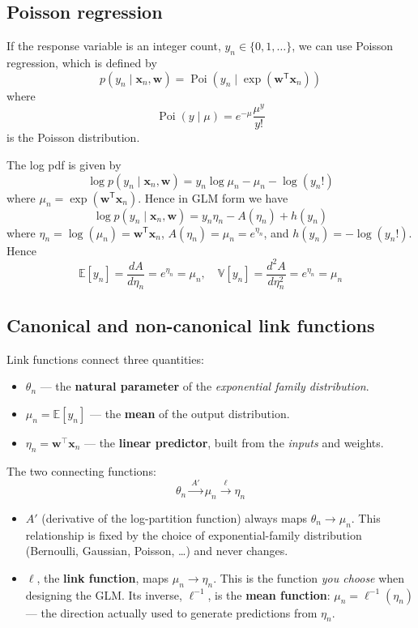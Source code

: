 \documentclass[11pt]{article}
\begin{document}
\subsection{Poisson regression}

If the response variable is an integer count, $y_n \in \{0,1,\ldots\}$, we can use Poisson regression, which is defined by
\[
p(y_n \mid \boldsymbol{x}_n, \boldsymbol{w})
= \operatorname{Poi}(y_n \mid \exp(\boldsymbol{w}^{\mathsf{T}}\boldsymbol{x}_n))
\]
where
\[
\operatorname{Poi}(y \mid \mu) = e^{-\mu}\frac{\mu^y}{y!}
\]
is the Poisson distribution.

The log pdf is given by
\[
\log p(y_n \mid \boldsymbol{x}_n, \boldsymbol{w})
= y_n\log \mu_n - \mu_n - \log(y_n!)
\]
where $\mu_n = \exp(\boldsymbol{w}^{\mathsf{T}}\boldsymbol{x}_n)$. Hence in GLM form we have
\[
\log p(y_n \mid \boldsymbol{x}_n, \boldsymbol{w})
= y_n\eta_n - A(\eta_n) + h(y_n)
\]
where $\eta_n = \log(\mu_n) = \boldsymbol{w}^{\mathsf{T}}\boldsymbol{x}_n$, $A(\eta_n) = \mu_n = e^{\eta_n}$, and $h(y_n) = -\log(y_n!)$. Hence
\[
\mathbb{E}[y_n] = \frac{dA}{d\eta_n} = e^{\eta_n} = \mu_n, \quad
\mathbb{V}[y_n] = \frac{d^2A}{d\eta_n^2} = e^{\eta_n} = \mu_n
\]

\subsection{Canonical and non-canonical link functions}

Link functions connect three quantities:
\begin{itemize}
    \item $\theta_n$ --- the \textbf{natural parameter} of the \textit{exponential family distribution}.
    \item $\mu_n = \mathbb{E}[y_n]$ --- the \textbf{mean} of the output distribution.
    \item $\eta_n = \boldsymbol{w}^\top \boldsymbol{x}_n$ --- the \textbf{linear predictor}, built from the \textit{inputs} and weights.
\end{itemize}

\noindent The two connecting functions:
$$
\theta_n \xrightarrow{\ A'\ } \mu_n \xrightarrow{\ \ell\ } \eta_n
$$
\begin{itemize}
    \item $A'$ (derivative of the log-partition function) always maps $\theta_n \to \mu_n$. This relationship is fixed by the choice of exponential-family distribution (Bernoulli, Gaussian, Poisson, \ldots) and never changes.
    \item $\ell$, the \textbf{link function}, maps $\mu_n \to \eta_n$. This is the function \emph{you choose} when designing the GLM. Its inverse, $\ell^{-1}$, is the \textbf{mean function}: $\mu_n = \ell^{-1}(\eta_n)$ --- the direction actually used to generate predictions from $\eta_n$.
\end{itemize}
\end{document}
